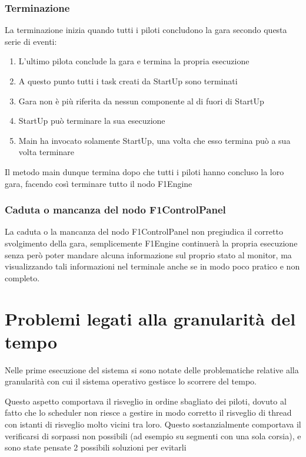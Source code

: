 \documentclass[a4paper,11pt, twoside]{book}
\begin{document}
	\subsubsection{Terminazione}
	  La terminazione inizia quando tutti i piloti concludono la gara secondo questa serie di eventi:
	  
	  \begin{enumerate}
	    \item L'ultimo pilota conclude la gara e termina la propria esecuzione
	    \item A questo punto tutti i task creati da StartUp sono terminati
	    \item Gara non è più riferita da nessun componente al di fuori di StartUp
	    \item StartUp può terminare la sua esecuzione
	    \item Main ha invocato solamente StartUp, una volta che esso termina può a sua volta terminare
	  \end{enumerate}
	  
	  Il metodo main dunque termina dopo che tutti i piloti hanno concluso la loro gara, facendo così
	  terminare tutto il nodo F1Engine
	  
	\subsubsection{Caduta o mancanza del nodo F1ControlPanel}
	  La caduta o la mancanza del nodo F1ControlPanel non pregiudica il corretto svolgimento della gara,
	  semplicemente F1Engine continuerà la propria esecuzione senza però poter mandare alcuna informazione
	  sul proprio stato al monitor, ma visualizzando tali informazioni nel terminale anche se in modo 
	  poco pratico e non completo.
    
    \section{Problemi legati alla granularità del tempo}
    \label{Problemi legati alla granularita del tempo}
      Nelle prime esecuzione del sistema si sono notate delle problematiche relative alla granularità con cui
      il sistema operativo gestisce lo scorrere del tempo.
      
      Questo aspetto comportava il risveglio in ordine sbagliato dei piloti, dovuto al fatto che lo scheduler
      non riesce a gestire in modo corretto il risveglio di thread con istanti di risveglio molto vicini tra loro.
      Questo sostanzialmente comportava il verificarsi di sorpassi non possibili (ad esempio su segmenti con una sola
      corsia), e sono state pensate 2 possibili soluzioni per evitarli
      
\end{document}
